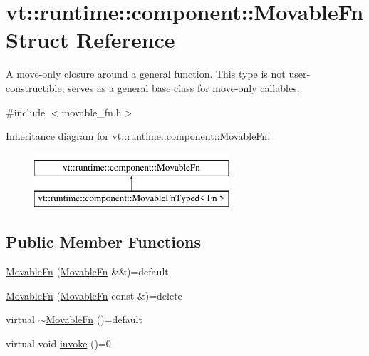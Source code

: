 \hypertarget{structvt_1_1runtime_1_1component_1_1_movable_fn}{}\section{vt\+:\+:runtime\+:\+:component\+:\+:Movable\+Fn Struct Reference}
\label{structvt_1_1runtime_1_1component_1_1_movable_fn}


A move-\/only closure around a general function. This type is not user-\/constructible; serves as a general base class for move-\/only callables.  




{\ttfamily \#include $<$movable\+\_\+fn.\+h$>$}

Inheritance diagram for vt\+:\+:runtime\+:\+:component\+:\+:Movable\+Fn\+:\begin{figure}[H]
\begin{center}
\leavevmode
\includegraphics[height=2.000000cm]{structvt_1_1runtime_1_1component_1_1_movable_fn}
\end{center}
\end{figure}
\subsection*{Public Member Functions}
\begin{DoxyCompactItemize}
\item 
\hyperlink{structvt_1_1runtime_1_1component_1_1_movable_fn_ab74d7289ccfbca29df1487af4cdd1f52}{Movable\+Fn} (\hyperlink{structvt_1_1runtime_1_1component_1_1_movable_fn}{Movable\+Fn} \&\&)=default
\item 
\hyperlink{structvt_1_1runtime_1_1component_1_1_movable_fn_a351c55ce7555f3ed5fb66fc18ae1ee86}{Movable\+Fn} (\hyperlink{structvt_1_1runtime_1_1component_1_1_movable_fn}{Movable\+Fn} const \&)=delete
\item 
virtual \hyperlink{structvt_1_1runtime_1_1component_1_1_movable_fn_a5a3a716c661129132695fa31af2878c5}{$\sim$\+Movable\+Fn} ()=default
\item 
virtual void \hyperlink{structvt_1_1runtime_1_1component_1_1_movable_fn_a3dc1fa79ff75471bcee31b5b25bd0d2a}{invoke} ()=0
\end{DoxyCompactItemize}
